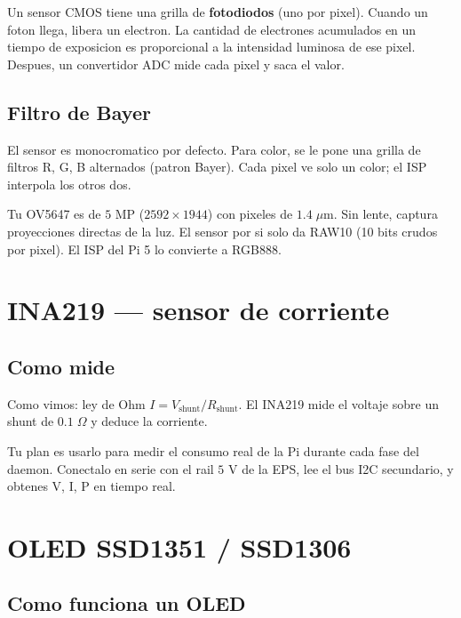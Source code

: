 \documentclass[11pt,a4paper,oneside,openright]{book}
\begin{document}
Un sensor CMOS tiene una grilla de \textbf{fotodiodos} (uno por pixel).
Cuando un foton llega, libera un electron. La cantidad de electrones
acumulados en un tiempo de exposicion es proporcional a la intensidad
luminosa de ese pixel. Despues, un convertidor ADC mide cada pixel y
saca el valor.

\section{Filtro de Bayer}

El sensor es monocromatico por defecto. Para color, se le pone una grilla
de filtros R, G, B alternados (patron Bayer). Cada pixel ve solo un color;
el ISP interpola los otros dos.

\begin{payload}
Tu OV5647 es de $5$ MP ($2592 \times 1944$) con pixeles de $1.4\;\mu$m. Sin
lente, captura proyecciones directas de la luz. El sensor por si solo da
RAW10 (10 bits crudos por pixel). El ISP del Pi 5 lo convierte a RGB888.
\end{payload}

\chapter{INA219 --- sensor de corriente}

\section{Como mide}

Como vimos: ley de Ohm $I = V_{\text{shunt}}/R_{\text{shunt}}$. El INA219
mide el voltaje sobre un shunt de $0.1\;\Omega$ y deduce la corriente.

\begin{payload}
Tu plan es usarlo para medir el consumo real de la Pi durante cada fase
del daemon. Conectalo en serie con el rail $5$ V de la EPS, lee el bus
I2C secundario, y obtenes V, I, P en tiempo real.
\end{payload}

\chapter{OLED SSD1351 / SSD1306}

\section{Como funciona un OLED}
\end{document}
